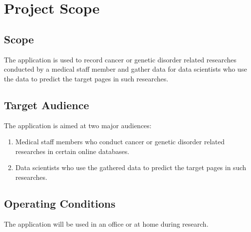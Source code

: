 \chapter{Project Scope}
\label{ch:scope}

\section{Scope}
The application is used to record cancer or genetic disorder related researches conducted by a medical staff member and gather data for data scientists who use the data to predict the target pages in such researches.
\section{Target Audience}
The application is aimed at two major audiences:
\begin{enumerate}
    \item Medical staff members who conduct cancer or genetic disorder related researches in certain online databases.
    \item Data scientists who use the gathered data to predict the target pages in such researches.
\end{enumerate}
\section{Operating Conditions}
The application will be used in an office or at home during research.